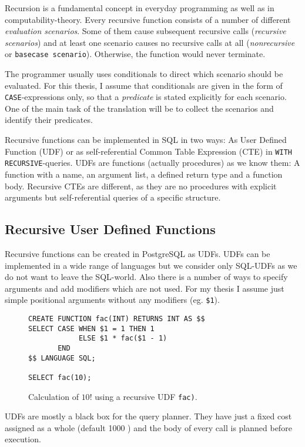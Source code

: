 Recursion is a fundamental concept in everyday programming as well as in computability-theory. Every recursive function consists of a number of different \textit{evaluation scenarios}. Some of them cause subsequent recursive calls (\textit{recursive scenarios}) and at least one scenario causes no recursive calls at all (\textit{nonrecursive} or \texttt{basecase scenario}). Otherwise, the function would never terminate.

The programmer usually uses conditionals to direct which scenario should be evaluated. For this thesis, I assume that conditionals are given in the form of \texttt{CASE}-expressions only, so that a \textit{predicate} is stated explicitly for each scenario. One of the main task of the translation will be to collect the scenarios and identify their predicates.

Recursive functions can be implemented in SQL in two ways: As User Defined Function (UDF) or as self-referential Common Table Expression (CTE) in \texttt{WITH RECURSIVE}-queries. UDFs are functions (actually procedures) as we know them: A function with a name, an argument list, a defined return type and a function body. Recursive CTEs are different, as they are no procedures with explicit arguments but self-referential queries of a specific structure.

\subsection{Recursive User Defined Functions}
Recursive functions can be created in PostgreSQL as UDFs. UDFs can be implemented in a wide range of languages but we consider only SQL-UDFs as we do not want to leave the SQL-world. Also there is a number of ways to specify arguments and add modifiers which are not used. For my thesis I assume just simple positional arguments without any modifiers (eg. \texttt{\$1}).

\begin{figure}[h!]
    \centering
    \begin{verbatim}
CREATE FUNCTION fac(INT) RETURNS INT AS $$
SELECT CASE WHEN $1 = 1 THEN 1
            ELSE $1 * fac($1 - 1)
       END
$$ LANGUAGE SQL;

SELECT fac(10);
    \end{verbatim}
    \caption{Calculation of $10!$ using a recursive UDF \texttt{fac)}.}
    \label{fig:my_label}
\end{figure}

UDFs are mostly a black box for the query planner. They have just a fixed cost assigned as a whole (default 1000 \cite[p. 1435]{psql}) and the body of every call is planned before execution.

